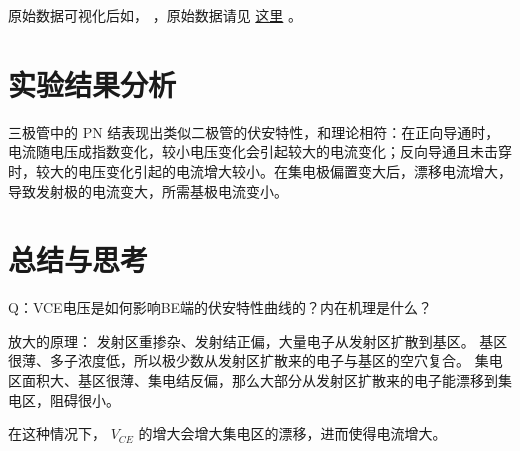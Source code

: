 \documentclass[lang=cn,11pt,a4paper,cite=authoryear]{elegantpaper}
\begin{document}
原始数据可视化后如， ，原始数据请见 \href{https://github.com/PannenetsF/Mirco-Electronic-Device-Experiment/tree/main/homework/hw07/01led}{这里} 。



\section{实验结果分析}

三极管中的 PN 结表现出类似二极管的伏安特性，和理论相符：在正向导通时，电流随电压成指数变化，较小电压变化会引起较大的电流变化；反向导通且未击穿时，较大的电压变化引起的电流增大较小。在集电极偏置变大后，漂移电流增大，导致发射极的电流变大，所需基极电流变小。

\section{总结与思考}

Q：VCE电压是如何影响BE端的伏安特性曲线的？内在机理是什么？

放大的原理：
发射区重掺杂、发射结正偏，大量电子从发射区扩散到基区。
基区很薄、多子浓度低，所以极少数从发射区扩散来的电子与基区的空穴复合。
集电区面积大、基区很薄、集电结反偏，那么大部分从发射区扩散来的电子能漂移到集电区，阻碍很小。

在这种情况下， \(V_{CE}\) 的增大会增大集电区的漂移，进而使得电流增大。



\end{document}
